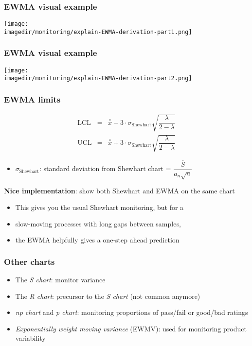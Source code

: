 \begin{frame}\frametitle{EWMA visual example}
	\begin{center}
		\texttt{[image: \\imagedir/monitoring/explain-EWMA-derivation-part1.png]}
	\end{center}
\end{frame}

\begin{frame}\frametitle{EWMA visual example}
	\begin{center}
		\texttt{[image: \\imagedir/monitoring/explain-EWMA-derivation-part2.png]}
	\end{center}
\end{frame}

\begin{frame}\frametitle{EWMA limits}

	$$
	\begin{array}{rcl}
		\text{LCL} &=& \bar{\bar{x}} - 3 \cdot \sigma_{\text{Shewhart}}\sqrt{\dfrac{\lambda}{2-\lambda}} \\
		\text{UCL} &=& \bar{\bar{x}} + 3 \cdot \sigma_{\text{Shewhart}} \sqrt{\dfrac{\lambda}{2-\lambda}}
	\end{array}
	$$
	\begin{itemize}
		\item	$\sigma_{\text{Shewhart}}$: standard deviation from Shewhart chart = $\dfrac{\overline{S}}{a_n\sqrt{n}}$
	\end{itemize}

	\vspace{12pt}
	\textbf{Nice implementation}: show both Shewhart and EWMA on the same chart
	\begin{itemize}
		\item	This gives you the usual Shewhart monitoring, but for a 
		\item	slow-moving processes with long gaps between samples, 
		\item	the EWMA helpfully gives a one-step ahead prediction
	\end{itemize}
\end{frame}

\begin{frame}\frametitle{Other charts}
	\begin{itemize}
		\item	The \emph{S chart}: monitor variance
		\item	The \emph{R chart}: precursor to the \emph{S chart} (not common anymore)
		\item	\emph{np chart} and \emph{p chart}: monitoring proportions of pass/fail or good/bad ratings
		\item	\emph{Exponentially weight moving variance} (EWMV): used for monitoring product variability
	\end{itemize}
\end{frame}

